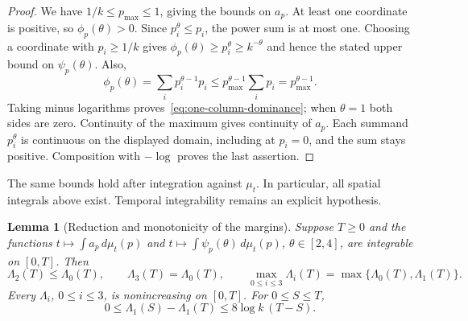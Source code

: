 \documentclass[11pt]{article}
\numberwithin{equation}{section}
\newtheorem{lemma}[theorem]{Lemma}
\theoremstyle{definition}
\theoremstyle{remark}
\newcommand{\1}{\mathbf 1}
\begin{document}
\begin{proof}
We have $1/k\le p_{\max}\le1$, giving the bounds on $a_p$.
At least one coordinate is positive, so $\phi_p(\theta)>0$.
Since $p_i^\theta\le p_i$, the power sum is at most one. Choosing a
coordinate with $p_i\ge1/k$ gives
$\phi_p(\theta)\ge p_i^\theta\ge k^{-\theta}$ and hence the stated
upper bound on $\psi_p(\theta)$. Also,
\[
 \phi_p(\theta)=\sum_i p_i^{\theta-1}p_i
 \le p_{\max}^{\theta-1}\sum_i p_i=p_{\max}^{\theta-1}.
\]
Taking minus logarithms proves~\eqref{eq:one-column-dominance}; when
$\theta=1$ both sides are zero. Continuity of the maximum gives
continuity of $a_p$. Each summand $p_i^\theta$ is continuous on the
displayed domain, including at $p_i=0$, and the sum stays positive.
Composition with $-\log$ proves the last assertion.
\end{proof}

The same bounds hold after integration against $\mu_t$. In particular,
all spatial integrals above exist. Temporal integrability remains an
explicit hypothesis.

\begin{lemma}[Reduction and monotonicity of the margins]
\label{lem:margin-dominance}
Suppose $T\ge0$ and the functions
$t\mapsto\int a_p\,d\mu_t(p)$ and
$t\mapsto\int\psi_p(\theta)\,d\mu_t(p)$, $\theta\in[2,4]$, are
integrable on $[0,T]$. Then
\begin{equation}\label{eq:dominance-reduction}
 \Lambda_2(T)\le\Lambda_0(T),\qquad
 \Lambda_3(T)=\Lambda_0(T),\qquad
 \max_{0\le i\le3}\Lambda_i(T)=\max\{\Lambda_0(T),\Lambda_1(T)\}.
\end{equation}
Every $\Lambda_i$, $0\le i\le3$, is nonincreasing on $[0,T]$.
For $0\le S\le T$,
\begin{equation}%
\label{eq:lambda-horizon}
 0\le\Lambda_1(S)-\Lambda_1(T)\le8\log k\,(T-S).
\end{equation}
\end{lemma}
\end{document}
